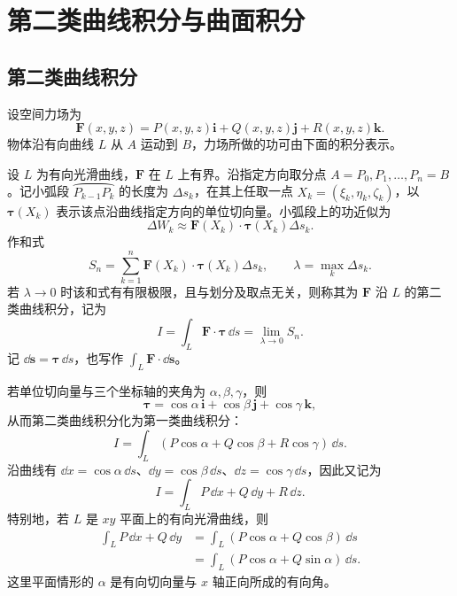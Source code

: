 \section{第二类曲线积分与曲面积分}
\subsection*{第二类曲线积分}
设空间力场为
\[
\boldsymbol F(x,y,z)=P(x,y,z)\boldsymbol i+Q(x,y,z)\boldsymbol j+R(x,y,z)\boldsymbol k.
\]
物体沿有向曲线 $L$ 从 $A$ 运动到 $B$，力场所做的功可由下面的积分表示。
\begin{definition}
设 $L$ 为有向光滑曲线，$\boldsymbol F$ 在 $L$ 上有界。沿指定方向取分点 $A=P_0,P_1,\ldots,P_n=B$。记小弧段 $\wideparen{P_{k-1}P_k}$ 的长度为 $\Delta s_k$，在其上任取一点 $X_k=(\xi_k,\eta_k,\zeta_k)$，以 $\boldsymbol\tau(X_k)$ 表示该点沿曲线指定方向的单位切向量。小弧段上的功近似为
\[
\Delta W_k\approx\boldsymbol F(X_k)\cdot\boldsymbol\tau(X_k)\Delta s_k.
\]
作和式
\[
S_n=\sum_{k=1}^n\boldsymbol F(X_k)\cdot\boldsymbol\tau(X_k)\Delta s_k,
\qquad \lambda=\max_k\Delta s_k.
\]
若 $\lambda\to0$ 时该和式有有限极限，且与划分及取点无关，则称其为 $\boldsymbol F$ 沿 $L$ 的第二类曲线积分，记为
\[
I=\int_L\boldsymbol F\cdot\boldsymbol\tau\,\dd s
=\lim_{\lambda\to0}S_n.
\]
记 $\dd\boldsymbol s=\boldsymbol\tau\,\dd s$，也写作 $\displaystyle\int_L\boldsymbol F\cdot\dd\boldsymbol s$。
\end{definition}
若单位切向量与三个坐标轴的夹角为 $\alpha,\beta,\gamma$，则
\[
\boldsymbol\tau=\cos\alpha\,\boldsymbol i+\cos\beta\,\boldsymbol j+\cos\gamma\,\boldsymbol k,
\]
从而第二类曲线积分化为第一类曲线积分：
\[
I=\int_L(P\cos\alpha+Q\cos\beta+R\cos\gamma)\,\dd s.
\]
沿曲线有 $\dd x=\cos\alpha\,\dd s$、$\dd y=\cos\beta\,\dd s$、$\dd z=\cos\gamma\,\dd s$，因此又记为
\[
I=\int_LP\,\dd x+Q\,\dd y+R\,\dd z.
\]
特别地，若 $L$ 是 $xy$ 平面上的有向光滑曲线，则
\begin{align*}
\int_LP\,\dd x+Q\,\dd y
&=\int_L(P\cos\alpha+Q\cos\beta)\,\dd s\\
&=\int_L(P\cos\alpha+Q\sin\alpha)\,\dd s.
\end{align*}
这里平面情形的 $\alpha$ 是有向切向量与 $x$ 轴正向所成的有向角。

